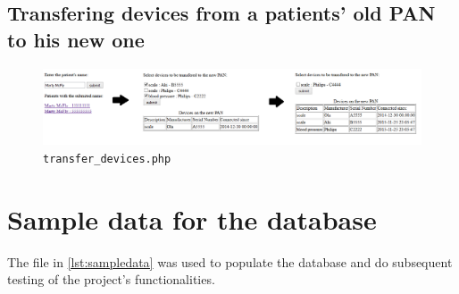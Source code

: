 \documentclass[a4paper,11pt]{article}
\begin{document}







\pagebreak
\subsection{Transfering devices from a patients' old PAN to his new one}

\begin{figure}[h]
    \centering
    \centerline{
      \includegraphics[width=\textwidth]{img/Transferir_all}
    }
    \caption{\texttt{transfer\_devices.php}}
    \label{img:transfer_devices.php}
\end{figure}






\pagebreak
\appendix
\section{Sample data for the database}

The file in \autoref{lst:sampledata} was used to populate the database and do subsequent testing of the project's functionalities.


\end{document}
